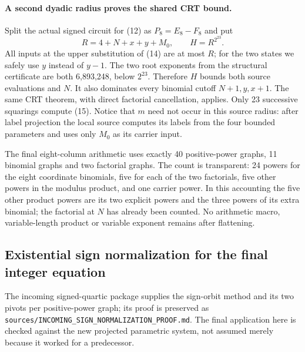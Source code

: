 \documentclass[11pt]{article}
\begin{document}
\paragraph{A second dyadic radius proves the shared CRT bound.}
Split the actual signed circuit for (12) as $P_8=E_8-F_8$ and put
\[
 R=4+N+x+y+M_0,\qquad H=R^{2^{23}}. \tag{15}
\]
All inputs at the upper substitution of (14) are at most $R$; for the two
states we safely use $y$ instead of $y-1$.  The two root exponents from
the structural certificate are both 6,893,248, below $2^{23}$.
Therefore $H$ bounds both source evaluations and $N$.  It also dominates
every binomial cutoff $N+1,y,x+1$.  The same CRT theorem, with direct
factorial cancellation, applies.  Only 23 successive squarings compute
(15).  Notice that $m$ need not occur in this source radius: after label
projection the local source computes its labels from the four bounded
parameters and uses only $M_0$ as its carrier input.

The final eight-column arithmetic uses exactly 40 positive-power graphs,
11 binomial graphs and two factorial graphs.  The count is transparent:
24 powers for the eight coordinate binomials, five for each of the two
factorials, five other powers in the modulus product, and one carrier
power.  In this accounting the five other product powers are its two
explicit powers and the three powers of its extra binomial; the factorial
at $N$ has already been counted.  No arithmetic macro, variable-length
product or variable exponent remains after flattening.

\subsection{Existential sign normalization for the final integer equation}

The incoming signed-quartic package supplies the sign-orbit method
and its two pivots per positive-power graph; its proof is preserved as
\nolinkurl{sources/INCOMING_SIGN_NORMALIZATION_PROOF.md}.  The final
application here is checked against the new projected parametric system,
not assumed merely because it worked for a predecessor.
\end{document}
